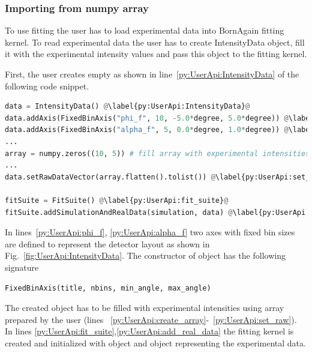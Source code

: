 


\subsubsection{Importing from numpy array}

To use fitting the user has to load experimental data into BornAgain fitting kernel.
To read experimental data the user has to create
IntensityData object, fill it with the experimental  intensity values and pass
this object to the fitting kernel.

First, the user creates empty  as shown
in line~\ref{py:UserApi:IntensityData} of the following code snippet.
\begin{lstlisting}[language=python, style=eclipseboxed]
data = IntensityData() @\label{py:UserApi:IntensityData}@
data.addAxis(FixedBinAxis("phi_f", 10, -5.0*degree, 5.0*degree)) @\label{py:UserApi:phi_f}@
data.addAxis(FixedBinAxis("alpha_f", 5, 0.0*degree, 1.0*degree)) @\label{py:UserApi:alpha_f}@
...
array = numpy.zeros((10, 5)) # fill array with experimental intensities @\label{py:UserApi:create_array}@
...
data.setRawDataVector(array.flatten().tolist()) @\label{py:UserApi:set_raw}@

fitSuite = FitSuite() @\label{py:UserApi:fit_suite}@
fitSuite.addSimulationAndRealData(simulation, data) @\label{py:UserApi:add_real_data}@
\end{lstlisting}

In lines~\ref{py:UserApi:phi_f}, \ref{py:UserApi:alpha_f} two axes with fixed bin sizes
are defined to represent the detector layout as shown in Fig.~\ref{fig:UserApi:IntensityData}. 
The constructor of  object has the following signature

\begin{lstlisting}[language=python, style=eclipse,numbers=none]
FixedBinAxis(title, nbins, min_angle, max_angle)
\end{lstlisting}

The created  object has to be filled with experimental intensities
using  array prepared by the user (lines ~\ref{py:UserApi:create_array}-~\ref{py:UserApi:set_raw}). In lines \ref{py:UserApi:fit_suite},\ref{py:UserApi:add_real_data} the fitting kernel is created and initialized with  object and 
 object representing the experimental data.


